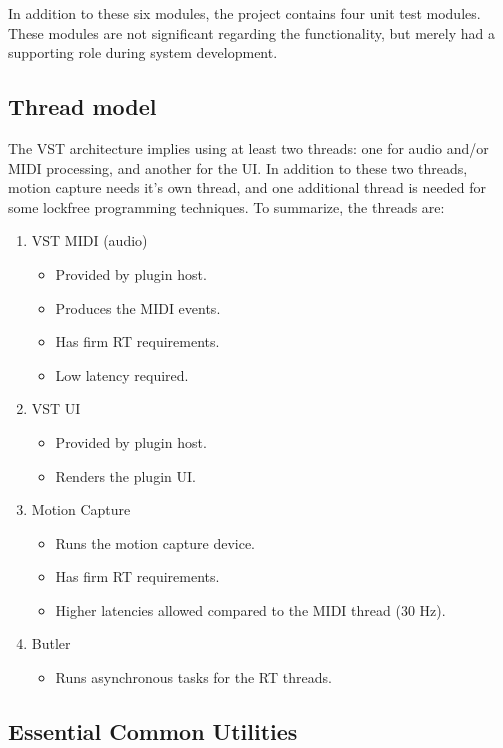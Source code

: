 In addition to these six modules,
the project contains four unit test modules.
These modules are not significant regarding the functionality,
but merely had a supporting role during system development.

\subsection{Thread model}

The VST architecture implies using at least two threads:
one for audio and/or MIDI processing,
and another for the UI.
In addition to these two threads,
motion capture needs it's own thread,
and one additional thread is needed for some
lockfree programming techniques.
To summarize, the threads are:
\begin{enumerate}

\item VST MIDI (audio)
\begin{itemize}
\item Provided by plugin host.
\item Produces the MIDI events.
\item Has firm RT requirements.
\item Low latency required.
\end{itemize}

\item VST UI
\begin{itemize}
\item Provided by plugin host.
\item Renders the plugin UI.
\end{itemize}

\item Motion Capture
\begin{itemize}
\item Runs the motion capture device.
\item Has firm RT requirements.
\item Higher latencies allowed compared to the MIDI thread (30 Hz).
\end{itemize}

\item Butler
\begin{itemize}
\item Runs asynchronous tasks for the RT threads.
\end{itemize}

\end{enumerate}

\subsection{Essential Common Utilities}

